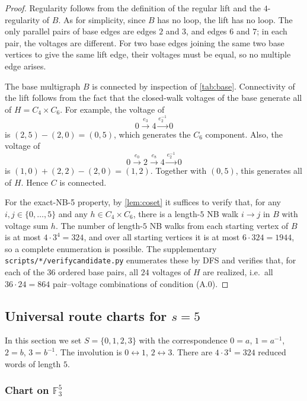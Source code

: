 \documentclass[11pt]{article}
\theoremstyle{definition}
\theoremstyle{remark}
\renewcommand{\_}{\textunderscore\allowbreak}
\begin{document}
\begin{proof}
Regularity follows from the definition of the regular
lift and the \(4\)-regularity of \(B\). As for simplicity, since \(B\)
has no loop, the lift has no loop. The only parallel pairs of base edges
are edges \(2\) and \(3\), and edges \(6\) and \(7\); in each pair, the
voltages are different. For two base edges joining the same two base
vertices to give the same lift edge, their voltages must be equal, so no
multiple edge arises.

The base multigraph \(B\) is connected by inspection of \cref{tab:base}.
Connectivity of the lift follows from the fact that the closed-walk
voltages of the base generate all of \(H=C_4\times C_6\). For example,
the voltage of \[
  0\xrightarrow{e_3}4\xrightarrow{e_2^{-1}}0
\] is \((2,5)-(2,0)=(0,5)\), which generates the \(C_6\) component.
Also, the voltage of \[
  0\xrightarrow{e_0}2\xrightarrow{e_8}4\xrightarrow{e_2^{-1}}0
\] is \((1,0)+(2,2)-(2,0)=(1,2)\). Together with \((0,5)\), this
generates all of \(H\). Hence \(C\) is connected.

For the exact-NB-5 property, by \cref{lem:coset} it suffices to verify that,
for any \(i,j\in\{0,\ldots,5\}\) and any \(h\in C_4\times C_6\), there
is a length-\(5\) NB walk \(i\to j\) in \(B\) with voltage sum \(h\).
The number of length-\(5\) NB walks from each starting vertex of \(B\)
is at most \(4\cdot3^4=324\), and over all starting vertices it is at
most \(6\cdot324=1944\), so a complete enumeration is possible.
The supplementary \texttt{scripts/*/verify\_candidate.py} enumerates these
by DFS and verifies that, for each of the \(36\) ordered base pairs, all
\(24\) voltages of \(H\) are realized, i.e.\ all \(36\cdot24=864\)
pair--voltage combinations of condition (A.0).
\end{proof}

\subsection{\texorpdfstring{Universal route charts for
\(s=5\)}{A.6 Universal route charts for s=5}}\label{a.6-universal-route-charts-for-s5}

In this section we set \(S=\{0,1,2,3\}\) with the correspondence
\(0=a\), \(1=a^{-1}\), \(2=b\), \(3=b^{-1}\). The involution is
\(0\leftrightarrow1\), \(2\leftrightarrow3\). There are
\(4\cdot3^4=324\) reduced words of length \(5\).

\subsubsection{\texorpdfstring{Chart on
\(\mathbb F_3^5\)}{A.6.1 Chart on \textbackslash mathbb F\_3\^{}5}}\label{a.6.1-chart-on-mathbb-f_35}
\end{document}

